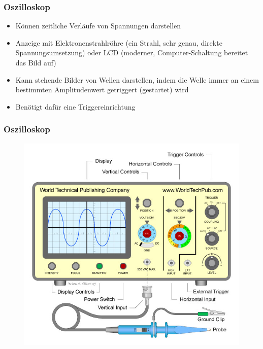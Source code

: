 \begin{frame}
  \frametitle{Oszilloskop}
  \begin{itemize}
    \item Können zeitliche Verläufe von Spannungen darstellen
    \item Anzeige mit Elektronenstrahlröhre (ein Strahl, sehr genau, direkte Spannungsumsetzung) oder LCD (moderner, Computer-Schaltung bereitet das Bild auf)
    \item Kann stehende Bilder von Wellen darstellen, indem die Welle immer an einem bestimmten Amplitudenwert getriggert (gestartet) wird
    \item Benötigt dafür eine Triggereinrichtung
  \end{itemize}
\end{frame}

\begin{frame}
  \frametitle{Oszilloskop}
  \begin{center}
    \begin{figure}
      \includegraphics[width=.75\textwidth,height=.75\textheight,keepaspectratio]{e17/WTPCOscilloscopeBeschreiben.jpg}
    \end{figure}
  \end{center}
\end{frame}


